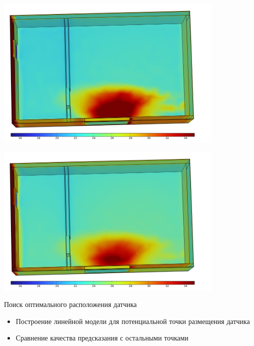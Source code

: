 \documentclass[14pt,aspectratio=169,hyperref={pdftex,unicode},xcolor=dvipsnames]{beamer}
\begin{document}
\begin{frame} \begin{center}
\includegraphics[width=11cm]{images/solar_radiation/solar_7.png}
\end{center} \end{frame}
\begin{frame} \begin{center}
\includegraphics[width=11cm]{images/solar_radiation/solar_8.png}
\end{center} \end{frame}



\begin{frame}{Поиск оптимального расположения датчика}

\begin{itemize}
\item Построение линейной модели для потенциальной точки размещения датчика
\item Сравнение качества предсказания с остальными точками
\end{itemize}

\end{frame}
\end{document}

